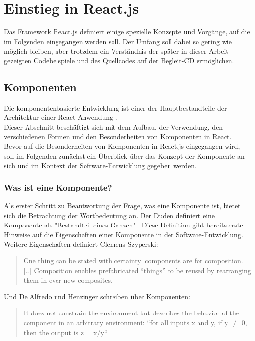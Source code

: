 \section{Einstieg in React.js}
Das Framework React.js definiert einige spezielle Konzepte und Vorgänge, auf die im Folgenden eingegangen werden soll. Der Umfang soll dabei so gering wie möglich bleiben, aber trotzdem ein Verständnis der später in dieser Arbeit gezeigten Codebeispiele und des Quellcodes auf der Begleit-CD ermöglichen.

\subsection{Komponenten}
Die komponentenbasierte Entwicklung ist einer der Hauptbestandteile der Architektur einer React-Anwendung \cite[S. 28]{Gackenheimer201509}. \\
Dieser Abschnitt beschäftigt sich mit dem Aufbau, der Verwendung, den verschiedenen Formen und den Besonderheiten von Komponenten in React.\\
Bevor auf die Besonderheiten von Komponenten in React.js eingegangen wird, soll im Folgenden zunächst ein Überblick über das Konzept der Komponente an sich und im Kontext der Software-Entwicklung gegeben werden.

\subsubsection{Was ist eine Komponente?}
\label{chap:component}
Als erster Schritt zu Beantwortung der Frage, was eine Komponente ist, bietet sich die Betrachtung der Wortbedeutung an. Der Duden definiert eine Komponente als "Bestandteil eines Ganzen" \cite{Dudenredaktion2006}. Diese Definition gibt bereits erste Hinweise auf die Eigenschaften einer Komponente in der Software-Entwicklung.\\
Weitere Eigenschaften definiert Clemens Szyperski:

\begin{quote}
  One thing can be stated with certainty: components are for composition. […] Composition enables prefabricated “things” to be reused by rearranging them in ever-new composites. \cite{Szyperski200211}
\end{quote}

Und De Alfredo und Henzinger schreiben über Komponenten:

\begin{quote}
  It does not constrain the environment but describes the behavior of the component in an arbitrary environment: “for all inputs x and y, if y $\neq$ 0, then the output is z = x/y“ \cite{de2001interface}
\end{quote}

